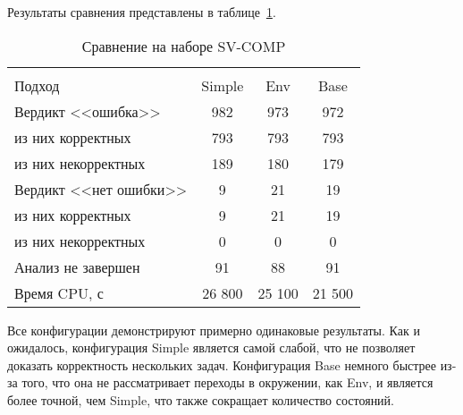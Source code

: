 Результаты сравнения представлены в таблице~\ref{table-svcomp-thread}.

  \begin{table}[h]\footnotesize \centering
    \caption{Сравнение на наборе SV-COMP}
  	\label{table-svcomp-thread}
    \begin{tabular}{ | l | c | c | c | }
      \hline
      		& 		\multicolumn{3}{c|}{\theory}  \\
      Подход         				& Simple   	& Env 		& Base  	\\ \hline
      Вердикт <<ошибка>> 			& 982    	& 973       & 972       \\ 
  \hspace{0.5cm} из них корректных 	& 793 		& 793 		& 793    	\\ 
  \hspace{0.5cm} из них некорректных & 189 		& 180 		& 179     	\\ \hline
      Вердикт <<нет ошибки>>  		& 9      	& 21        & 19       	\\ 
  \hspace{0.5cm} из них корректных 	& 9 		& 21    	& 19      	\\
  \hspace{0.5cm} из них некорректных & 0 		& 0    		& 0     	\\ \hline
      Анализ не завершен       		& 91     	& 88        & 91    	\\ \hline
      Время CPU, с   				& 26 800 	& 25 100    & 21 500  	\\
      \hline
    \end{tabular}
  \end{table}

Все конфигурации демонстрируют примерно одинаковые результаты. 
Как и ожидалось, конфигурация Simple является самой слабой, что не позволяет доказать корректность нескольких задач.
Конфигурация Base немного быстрее из-за того, что она не рассматривает переходы в окружении, как Env, и является более точной, чем Simple, что также сокращает количество состояний.

